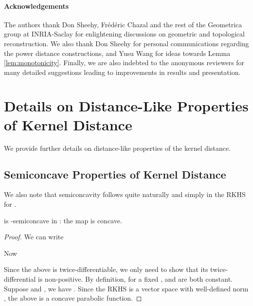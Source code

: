 \documentclass[11pt]{myclass}
\begin{document}
\paragraph{Acknowledgements}
The authors thank Don Sheehy, Fr\'{e}d\'{e}ric Chazal and the rest of the Geometrica group at  INRIA-Saclay for enlightening discussions on geometric and topological reconstruction.  
We also thank Don Sheehy for personal communications regarding the power distance constructions, 
and Yusu Wang for ideas towards Lemma \ref{lem:monotonicity}.  Finally, we are also indebted to the anonymous reviewers for many detailed suggestions leading to improvements in results and presentation.  









\newpage
\appendix













\section{Details on Distance-Like Properties of Kernel Distance}
\label{app:dist-like}

We provide further details on distance-like properties of the kernel distance.  

\subsection{Semiconcave Properties of Kernel Distance}


We also note that semiconcavity follows quite naturally and simply in the RKHS  for .  

\begin{lemma}
\label{lemma:RKHS-concave}
 is -semiconcave in : the map  is concave. 
\end{lemma}
\begin{proof}
We can write 

Now 

Since the above is twice-differentiable, we only need to show that its twice-differential is non-positive. 
By definition, for a fixed ,  and  are both constant. 
Suppose  and ,
we have .
Since the RKHS  is a vector space with well-defined norm , 
the above is a concave parabolic function.  
\end{proof}
\end{document}
